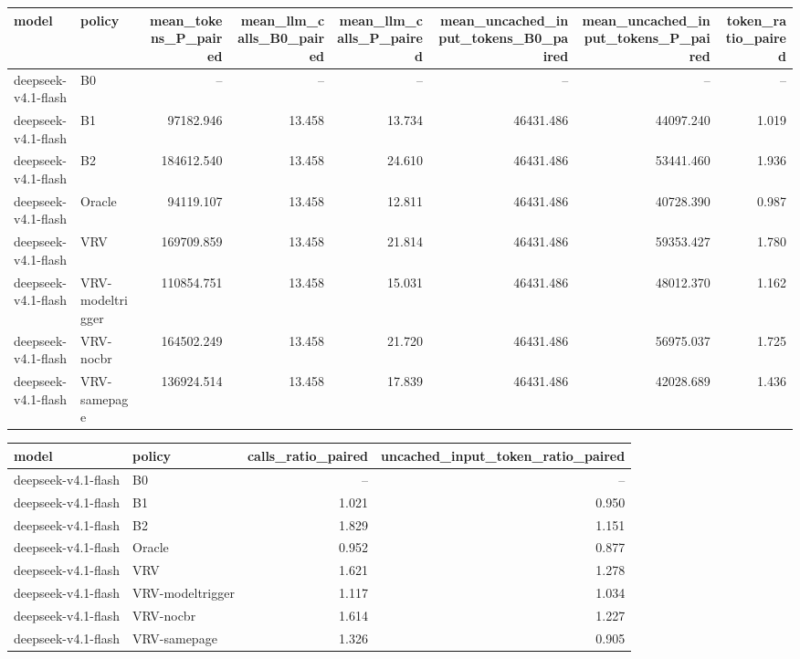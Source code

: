 \begin{tabular}{llrrrrrr}
\toprule
model & policy & mean\_tokens\_P\_paired & mean\_llm\_calls\_B0\_paired & mean\_llm\_calls\_P\_paired & mean\_uncached\_input\_tokens\_B0\_paired & mean\_uncached\_input\_tokens\_P\_paired & token\_ratio\_paired \\
\midrule
deepseek-v4.1-flash & B0 & -- & -- & -- & -- & -- & -- \\
deepseek-v4.1-flash & B1 & 97182.946 & 13.458 & 13.734 & 46431.486 & 44097.240 & 1.019 \\
deepseek-v4.1-flash & B2 & 184612.540 & 13.458 & 24.610 & 46431.486 & 53441.460 & 1.936 \\
deepseek-v4.1-flash & Oracle & 94119.107 & 13.458 & 12.811 & 46431.486 & 40728.390 & 0.987 \\
deepseek-v4.1-flash & VRV & 169709.859 & 13.458 & 21.814 & 46431.486 & 59353.427 & 1.780 \\
deepseek-v4.1-flash & VRV-modeltrigger & 110854.751 & 13.458 & 15.031 & 46431.486 & 48012.370 & 1.162 \\
deepseek-v4.1-flash & VRV-nocbr & 164502.249 & 13.458 & 21.720 & 46431.486 & 56975.037 & 1.725 \\
deepseek-v4.1-flash & VRV-samepage & 136924.514 & 13.458 & 17.839 & 46431.486 & 42028.689 & 1.436 \\
\bottomrule
\end{tabular}

\begin{tabular}{llrr}
\toprule
model & policy & calls\_ratio\_paired & uncached\_input\_token\_ratio\_paired \\
\midrule
deepseek-v4.1-flash & B0 & -- & -- \\
deepseek-v4.1-flash & B1 & 1.021 & 0.950 \\
deepseek-v4.1-flash & B2 & 1.829 & 1.151 \\
deepseek-v4.1-flash & Oracle & 0.952 & 0.877 \\
deepseek-v4.1-flash & VRV & 1.621 & 1.278 \\
deepseek-v4.1-flash & VRV-modeltrigger & 1.117 & 1.034 \\
deepseek-v4.1-flash & VRV-nocbr & 1.614 & 1.227 \\
deepseek-v4.1-flash & VRV-samepage & 1.326 & 0.905 \\
\bottomrule
\end{tabular}
